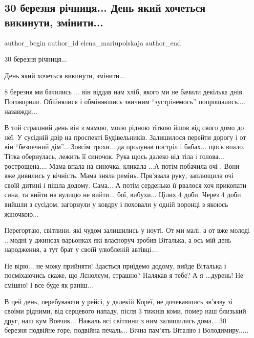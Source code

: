  
 
 
 
 

\subsection{30 березня річниця... День який хочеться викинути, змінити...}
\label{sec:30_03_2023.fb.elena_mariupolskaja.1.richnycja_den_jakyj_hochetsja_vykynuty}

\ifcmt
 author_begin
   author_id elena_mariupolskaja
 author_end
\fi

30 березня річниця...

День який хочеться викинути, змінити...

8 березня ми бачились ... він віддав нам хліб, якого ми не бачили декілька днів.
Поговорили. Обійнялися і обмінявшись звичним \enquote{зустрінемось}
попрощались.... назавжди...

В той страшний день він з мамою, моєю рідною тіткою йшов від свого домо до
неї. У сусідній двір на проспекті Будівельників. Залишилося перейти дорогу і
от він \enquote{безпечний дім}... Зовсім трохи... да пролунав постріл і бабах... щось
впало. Тітка обернулась, лежить її синочок. Рука щось далеко від тіла і
голова... рострощена.... Мама впала на синочка, кликала ...А потім побачила
очі . Вони вже дивились у вічність.  Мама зняла ремінь. Прв'язала руку,
заплющила очі своїй дитині і пішла додому. Сама... А потім серденько її
рвалося хоч прикопати сина, та вийти на вулицю не вийти... бої, вибухи... Цілих
4 доби. Через 4 доби вийшли з сусідом, загорнули у ковдру і поховали у одній
воронці з якоюсь жіночкою...

Перегортаю, світлини, які чудом залишились у ноуті. От ми малі, а от вже
молоді ...модні у джинсах-варьонках які власноруч зробив Віталька, а ось мій
день народження, а тут брат у своїй улюбленій автівці....

Не вірю... не можу прийняти! Здається приїдемо додому, вийде Віталька і
посміхаючись скаже, що Лєнолєум, страшно? Налякав я тебе? А я ...дурень! Не
смішно! І все буде як раніш...

В цей день, перебуваючи у рейсі, у далекій Кореї, не дочекавшись зв'язву
зі своїми рідними, від серцевого нападу, після 3 тижнів коми, помер наш
близький друг, наш кум Вовчик... Нажаль всі світлини з ним залишились
дома... 30 березня подвійне горе, подвійна печаль... Вічна пам'ять Віталію і
Володимиру.....

